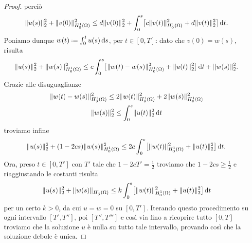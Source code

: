 \begin{proof}
    perciò
    \begin{equation}
        \norm{u(s)}_2^2+\norm{v(0)}_{\sobHc[1]{\Omega}}^2\le
        d\norm{v(0)}_2^2+\int_0^s\bigl[c\norm{v(t)}_{\sobHc[1]{\Omega}}^2+d\norm{v(t)}_2^2\bigr]\,\dd t.
    \end{equation}
    Poniamo dunque $w(t)\defeq\int_0^t u(s)\,\dd s$, per $t\in[0,T]$: dato che $v(0)=w(s)$, risulta
    \begin{equation}
        \norm{u(s)}_2^2+\norm{w(s)}_{\sobHc[1]{\Omega}}^2\le
        c\int_0^s\bigl[\norm{w(t)-w(s)}_{\sobHc[1]{\Omega}}^2+\norm{u(t)}_2^2\bigr]\,\dd t+\norm{w(s)}_2^2.
    \end{equation}
    Grazie alle disuguaglianze
    \begin{gather}
        \norm{w(t)-w(s)}_{\sobHc[1]{\Omega}}^2 \le 2\norm{w(t)}_{\sobHc[1]{\Omega}}^2+2\norm{w(s)}_{\sobHc[1]{\Omega}}^2\\
        \norm{w(s)}_2^2 \le \int_0^s\norm{u(t)}_2^2\,\dd t
    \end{gather}
    troviamo infine
    \begin{equation}
        \norm{u(s)}_2^2+(1-2cs)\norm{w(s)}_{\sobHc[1]{\Omega}}^2\le
        2c\int_0^s\bigl[\norm{w(t)}_{\sobHc[1]{\Omega}}^2+\norm{u(t)}_2^2\bigr]\,\dd t.
    \end{equation}
    Ora, preso $t\in[0,T']$ con $T'$ tale che $1-2cT'=\frac12$ troviamo che $1-2cs\ge\frac12$ e riaggiustando le costanti risulta
    \begin{equation}
        \norm{u(s)}_2^2+\norm{w(s)}_{\sobHc[1]{\Omega}}\le k\int_0^s\bigl[\norm{w(t)}_{\sobHc[1]{\Omega}}^2+\norm{u(t)}_2^2\bigr]\,\dd t
    \end{equation}
    per un certo $k>0$, da cui $u=w=0$ su $[0,T']$.
    Iterando questo procedimento su ogni intervallo $[T',T'']$, poi $[T'',T''']$ e cos\`i via fino a ricoprire tutto $[0,T]$ troviamo che la soluzione $u$ è nulla su tutto tale intervallo, provando cos\`i che la soluzione debole è unica.
\end{proof}

